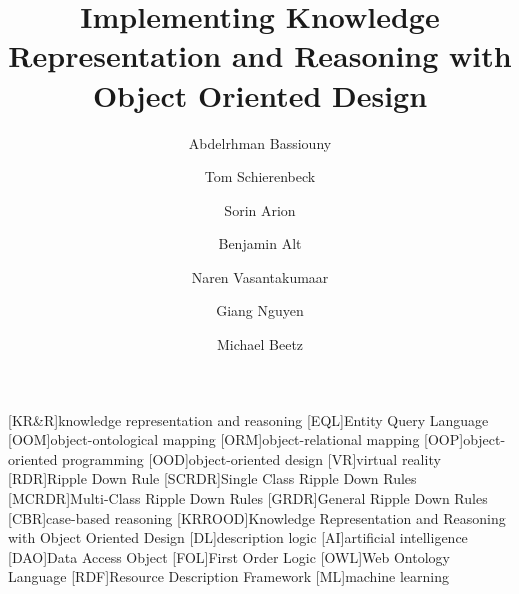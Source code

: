 \documentclass[a4paper,fleqn]{cas-sc}
\begin{document}
\let\WriteBookmarks\relax
\def\floatpagepagefraction{1}
\def\textpagefraction{.001}

[KR\&R]{knowledge representation and reasoning}
[EQL]{Entity Query Language}
[OOM]{object-ontological mapping}
[ORM]{object-relational mapping}
[OOP]{object-oriented programming}
[OOD]{object-oriented design}
[VR]{virtual reality}
[RDR]{Ripple Down Rule}
[SCRDR]{Single Class Ripple Down Rules}
[MCRDR]{Multi-Class Ripple Down Rules}
[GRDR]{General Ripple Down Rules}
[CBR]{case-based reasoning}
[KRROOD]{Knowledge Representation and Reasoning with Object Oriented Design}
[DL]{description logic}
[AI]{artificial intelligence}
[DAO]{Data Access Object}
[FOL]{First Order Logic}
[OWL]{Web Ontology Language}
[RDF]{Resource Description Framework}
[ML]{machine learning}




\title [mode = title]{Implementing Knowledge Representation and Reasoning with Object Oriented Design}

\author[1]{Abdelrhman Bassiouny}
\cormark[1]

\author[1]{Tom Schierenbeck}

\author[1]{Sorin Arion}

\author[1]{Benjamin Alt}

\author[1]{Naren Vasantakumaar}

\author[1]{Giang Nguyen}

\author[1]{Michael Beetz}

\end{document}
